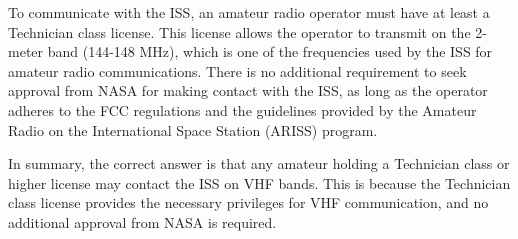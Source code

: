 To communicate with the ISS, an amateur radio operator must have at least a Technician class license. This license allows the operator to transmit on the 2-meter band (144-148 MHz), which is one of the frequencies used by the ISS for amateur radio communications. There is no additional requirement to seek approval from NASA for making contact with the ISS, as long as the operator adheres to the FCC regulations and the guidelines provided by the Amateur Radio on the International Space Station (ARISS) program.

In summary, the correct answer is that any amateur holding a Technician class or higher license may contact the ISS on VHF bands. This is because the Technician class license provides the necessary privileges for VHF communication, and no additional approval from NASA is required.

